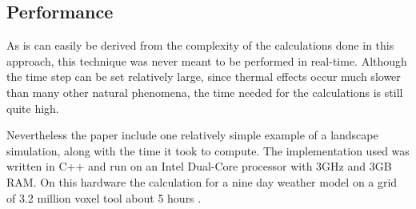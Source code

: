 \subsection{Performance}
As is can easily be derived from the complexity of the calculations done in this approach, this technique was never meant to be performed in real-time. Although the time step can be set relatively large, since thermal effects occur much slower than many other natural phenomena, the time needed for the calculations is still quite high.

Nevertheless the paper include one relatively simple example of a landscape simulation, along with the time it took to compute. The implementation used was written in C++ and run on an Intel Dual-Core processor with 3GHz and 3GB RAM. On this hardware the calculation for a nine day weather model on a grid of 3.2 million voxel tool about 5 hours \cite{benes2001layered}.